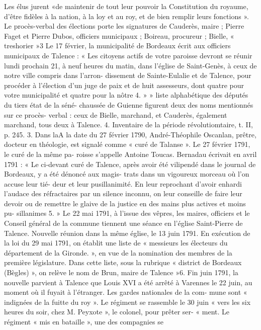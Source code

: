 \documentclass[a4paper,11pt]{book}
\begin{document}
Les élus jurent «de maintenir de tout leur pouvoir la
Constitution du royaume, d'être fidèles à la nation, à la
loy et au roy, et de bien remplir leurs fonctions ».
Le procès-verbal des élections porte les signatures de
Cauderès, maire ; Pierre Faget et Pierre Dubos, officiers
municipaux ; Boireau, procureur ; Bielle, « treshorier »3
Le 17 février, la municipalité de Bordeaux écrit aux
officiers municipaux de Talence :
« Les citoyens actifs de votre paroisse devront se réunir
lundi prochain 21, à neuf heures du matin, dans l'église
de Saint-Genès, à ceux de notre ville compris dans l'arron-
dissement de Sainte-Eulalie et de Talence, pour procéder
à l'élection d'un juge de paix et de huit assesseurs, dont
quatre pour votre municipalité et quatre pour la nôtre 4. »
»
liste alphabétique des députés du tiers état de la séné-
chaussée de Guienne figurent deux des noms mentionnés sur ce procès-
verbal : ceux de Bielle, marchand, et Cauderès, également marchand,
tous deux à Talence.
4. Inventaire de la période révolutiomtaire, t. II, p. 245.
3. Dans laA la date du 27 février 1790, André-Théophile Oscanlan,
prêtre, docteur en théologie, est signalé comme « curé
de Talanse ». Le 27 février 1791, le curé de la même pa-
roisse s'appelle Antoine Toucas.
Bernadau écrivait en avril 1791 :
« Le ci-devant curé de Talence, après avoir été vilipendé
dans le journal de Bordeaux, y a été dénoncé aux magis-
trats dans un vigoureux morceau où l'on accuse leur tié-
deur et leur pusillanimité. En leur reprochant d'avoir
enhardi l'audace des réfractaires par un silence inconnu,
on leur conseille de faire leur devoir ou de remettre le
glaive de la justice en des mains plus actives et moins pu-
sillanimes 5. »
Le 22 mai 1791, à l'issue des vêpres, les maires, officiers
et le Conseil général de la commune tiennent une séance
en l'église Saint-Pierre de Talence. Nouvelle réunion dans
la même église, le 13 juin 1791.
En exécution de la loi du 29 mai 1791, on établit une
liste de « messieurs les électeurs du département de la
Gironde. », en vue de la nomination des membres de la
première législature. Dans cette liste, sous la rubrique
« district de Bordeaux (Bègles) », on relève le nom de
Brun, maire de Talence »6.
Fin juin 1791, la nouvelle parvient à Talence que
Louis XVI a été arrêté à Varennes le 22 juin, au moment
où il fuyait à l'étranger. Les gardes nationales de la com-
mune sont « indignées de la fuitte du roy ».
Le régiment se rassemble le 30 juin « vers les six heures
du soir, chez M. Peyxote », le colonel, pour prêter ser-
«
ment.
Le régiment « mis en bataille », une des compagnies se
\end{document}
